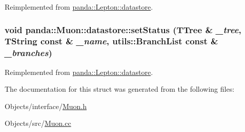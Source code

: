 Reimplemented from \hyperlink{structpanda_1_1Lepton_1_1datastore_a01bc67f154130787caab05786b3169c6}{panda::Lepton::datastore}.\hypertarget{structpanda_1_1Muon_1_1datastore_a930f982ca62e2c7ceeb62dfcd5e03db9}{
\subsubsection[{setStatus}]{\setlength{\rightskip}{0pt plus 5cm}void panda::Muon::datastore::setStatus (TTree \& {\em \_\-tree}, \/  TString const \& {\em \_\-name}, \/  {\bf utils::BranchList} const \& {\em \_\-branches})}}
\label{structpanda_1_1Muon_1_1datastore_a930f982ca62e2c7ceeb62dfcd5e03db9}


Reimplemented from \hyperlink{structpanda_1_1Lepton_1_1datastore_a0a158cefd0f32a98625eb5736c414b01}{panda::Lepton::datastore}.

The documentation for this struct was generated from the following files:\begin{DoxyCompactItemize}
\item 
Objects/interface/\hyperlink{Muon_8h}{Muon.h}\item 
Objects/src/\hyperlink{Muon_8cc}{Muon.cc}\end{DoxyCompactItemize}
